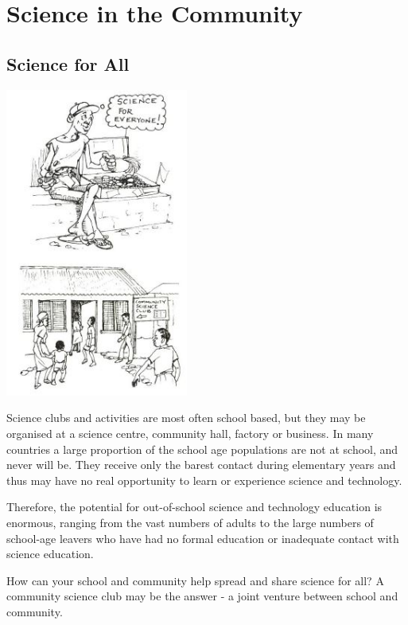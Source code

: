 \chapter{Science in the Community}

\begin{multicols}{2}


\section{Science for All}

\begin{center}
\includegraphics[width=0.45\textwidth]{./img/source/science-for-all.jpg}
\end{center}

Science clubs and activities are most often school based,
but they may be organised at a science centre,
community hall, factory or business.
In many countries a large proportion of the
school age populations are not at school, and
never will be. They receive only the barest
contact during elementary years and thus may
have no real opportunity to learn or experience
science and technology. 

Therefore, the potential
for out-of-school science and technology
education is enormous, ranging from the vast
numbers of adults to the large numbers of school-age
leavers who have had no formal education
or inadequate contact with science education.

How can your school and community help
spread and share science for all?
A community science club may be the answer - a
joint venture between school and community.



\end{multicols}
